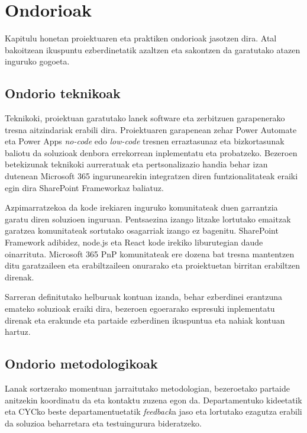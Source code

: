 \chapter{Ondorioak}


     Kapitulu honetan proiektuaren eta praktiken ondorioak jasotzen dira. Atal bakoitzean
     ikuspuntu ezberdinetatik azaltzen eta sakontzen da garatutako atazen inguruko gogoeta.



\section{Ondorio teknikoak}
Teknikoki, proiektuan garatutako lanek software eta zerbitzuen garapenerako tresna aitzindariak erabili dira.
Proiektuaren garapenean zehar Power Automate eta Power Apps \textit{no-code} edo \textit{low-code} tresnen erraztasunaz eta bizkortasunak baliotu da soluzioak denbora errekorrean inplementatu eta probatzeko.
Bezeroen betekizunak teknikoki aurreratuak eta pertsonalizazio handia behar izan dutenean Microsoft 365 ingurunearekin integratzen diren funtzionalitateak eraiki egin dira SharePoint Frameworkaz baliatuz.

Azpimarratzekoa da kode irekiaren inguruko komunitateak duen garrantzia garatu diren soluzioen inguruan. Pentsaezina izango litzake lortutako emaitzak garatzea komunitateak sortutako osagarriak izango ez bagenitu.
SharePoint Framework adibidez, node.js eta React kode irekiko liburutegian daude oinarrituta. Microsoft 365 PnP komunitateak ere dozena bat tresna mantentzen ditu garatzaileen eta erabiltzaileen onurarako eta proiektuetan birritan erabiltzen direnak. 

Sarreran definitutako helburuak kontuan izanda, behar ezberdinei erantzuna emateko soluzioak eraiki dira, bezeroen egoerarako espresuki inplementatu direnak eta erakunde eta partaide ezberdinen ikuspuntua eta nahiak kontuan hartuz.

\section{Ondorio metodologikoak}
Lanak sortzerako momentuan jarraitutako metodologian, bezeroetako partaide anitzekin koordinatu da eta kontaktu zuzena egon da. Departamentuko kideetatik eta CYCko beste departamentuetatik \textit{feedback}a jaso eta lortutako ezagutza erabili da soluzioa beharretara eta testuingurura bideratzeko. 

